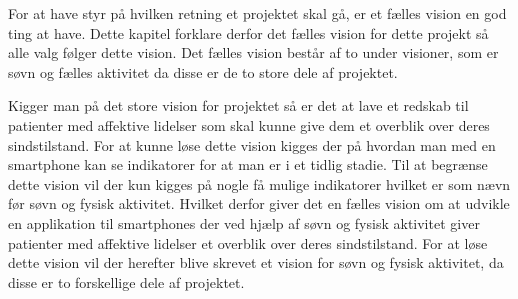 For at have styr på hvilken retning et projektet skal gå, er et fælles vision en god ting at have.
Dette kapitel forklare derfor det fælles vision for dette projekt så alle valg følger dette vision.
Det fælles vision består af to under visioner, som er søvn og fælles aktivitet da disse er de to store dele af projektet.

Kigger man på det store vision for projektet så er det at lave et redskab til patienter med affektive lidelser som skal kunne give dem et overblik over deres sindstilstand.
For at kunne løse dette vision kigges der på hvordan man med en smartphone kan se indikatorer for at man er i et tidlig stadie.
Til at begrænse dette vision vil der kun kigges på nogle få mulige indikatorer hvilket er som nævn før søvn og fysisk aktivitet.
Hvilket derfor giver det en fælles vision om at udvikle en applikation til smartphones der ved hjælp af søvn og fysisk aktivitet giver patienter med affektive lidelser et overblik over deres sindstilstand.
For at løse dette vision vil der herefter blive skrevet et vision for søvn og fysisk aktivitet, da disse er to forskellige dele af projektet.

